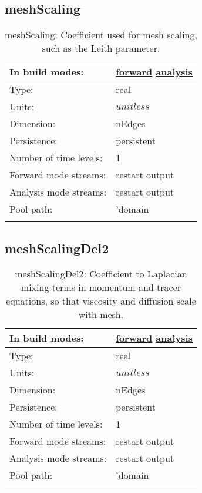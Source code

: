 \subsection[meshScaling]{meshScaling}
\label{subsec:var_sec_mesh_meshScaling}
\begin{center}
\begin{longtable}{| p{2.0in} | p{4.0in} |}
        \hline 
        In build modes: & \hyperref[subsec:forward_var_tab_mesh]{forward} \hyperref[subsec:analysis_var_tab_mesh]{analysis} \\
        \hline 
        Type: & real \\
        \hline 
        Units: & $unitless$ \\
        \hline 
        Dimension: & nEdges \\
        \hline 
        Persistence: & persistent \\
        \hline 
        Number of time levels: & 1 \\
        \hline 
		 Forward mode streams: &  restart output \\
        \hline 
		 Analysis mode streams: &  restart output \\
        \hline 
            Pool path: & 'domain %
 \\
		 \hline 
    \caption{meshScaling: Coefficient used for mesh scaling, such as the Leith parameter.}
\end{longtable}
\end{center}
\subsection[meshScalingDel2]{meshScalingDel2}
\label{subsec:var_sec_mesh_meshScalingDel2}
\begin{center}
\begin{longtable}{| p{2.0in} | p{4.0in} |}
        \hline 
        In build modes: & \hyperref[subsec:forward_var_tab_mesh]{forward} \hyperref[subsec:analysis_var_tab_mesh]{analysis} \\
        \hline 
        Type: & real \\
        \hline 
        Units: & $unitless$ \\
        \hline 
        Dimension: & nEdges \\
        \hline 
        Persistence: & persistent \\
        \hline 
        Number of time levels: & 1 \\
        \hline 
		 Forward mode streams: &  restart output \\
        \hline 
		 Analysis mode streams: &  restart output \\
        \hline 
            Pool path: & 'domain %
 \\
		 \hline 
    \caption{meshScalingDel2: Coefficient to Laplacian mixing terms in momentum and tracer equations, so that viscosity and diffusion scale with mesh.}
\end{longtable}
\end{center}
